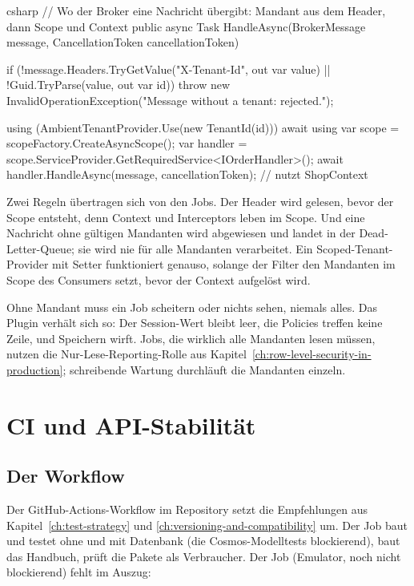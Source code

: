 \begin{sourcecode}{csharp}
// Wo der Broker eine Nachricht übergibt: Mandant aus dem Header, dann Scope und Context
public async Task HandleAsync(BrokerMessage message, CancellationToken cancellationToken)
{
    if (!message.Headers.TryGetValue("X-Tenant-Id", out var value)
        || !Guid.TryParse(value, out var id))
        throw new InvalidOperationException("Message without a tenant: rejected.");

    using (AmbientTenantProvider.Use(new TenantId(id)))
    {
        await using var scope = scopeFactory.CreateAsyncScope();
        var handler = scope.ServiceProvider.GetRequiredService<IOrderHandler>();
        await handler.HandleAsync(message, cancellationToken);   // nutzt ShopContext
    }
}
\end{sourcecode}

Zwei Regeln übertragen sich von den Jobs. Der Header wird gelesen, bevor der Scope entsteht,
denn Context und Interceptors leben im Scope. Und eine Nachricht ohne gültigen Mandanten wird
abgewiesen und landet in der Dead-Letter-Queue; sie wird nie für alle Mandanten verarbeitet.
Ein Scoped-Tenant-Provider mit Setter funktioniert genauso, solange der Filter den Mandanten im
Scope des Consumers setzt, bevor der Context aufgelöst wird.

\begin{important}
  Ohne Mandant muss ein Job scheitern oder nichts sehen, niemals alles. Das Plugin verhält
  sich so: Der Session-Wert bleibt leer, die Policies treffen keine Zeile, und Speichern
  wirft. Jobs, die wirklich alle Mandanten lesen müssen, nutzen die Nur-Lese-Reporting-Rolle
  aus Kapitel~\ref{ch:row-level-security-in-production}; schreibende Wartung durchläuft die
  Mandanten einzeln.
\end{important}

\chapter{CI und API-Stabilität}\label{ch:ci-and-api-stability}

\section{Der Workflow}

Der GitHub-Actions-Workflow im Repository setzt die Empfehlungen aus
Kapitel~\ref{ch:test-strategy} und \ref{ch:versioning-and-compatibility} um. Der Job
 baut und testet ohne und mit Datenbank (die Cosmos-Modelltests blockierend),  baut das Handbuch,
 prüft die Pakete als Verbraucher. Der Job  (Emulator, noch nicht
blockierend) fehlt im Auszug:

